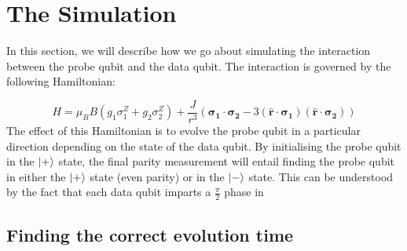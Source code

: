 \documentclass[%
 reprint,
 amsmath,amssymb,
 aps,
]{revtex4-1}
\begin{document}
\section{The Simulation}
In this section, we will describe how we go about simulating the interaction between the probe qubit and the data qubit. The interaction is governed by the following Hamiltonian:

\begin{equation}
H = \mu_B B( g_1 \sigma_1^Z + g_2 \sigma_2^Z) + \frac{J}{r^3} ( \mathbf{\sigma_1} \cdot \mathbf{\sigma_2} - 3 ( \hat{\mathbf{r}} \cdot \mathbf{\sigma_1}) ( \hat{\mathbf{r}}\cdot \mathbf{\sigma_2}))
\end{equation}
The effect of this Hamiltonian is to evolve the probe qubit in a particular direction depending on the state of the data qubit. By initialising the probe qubit in the $\ket{+}$ state, the final parity measurement will entail finding the probe qubit in either the $\ket{+}$ state (even parity) or in the $\ket{-}$ state. This can be understood by the fact that each data qubit imparts a $\frac{\pi}{2}$ phase in 

\subsection{Finding the correct evolution time}
\end{document}
